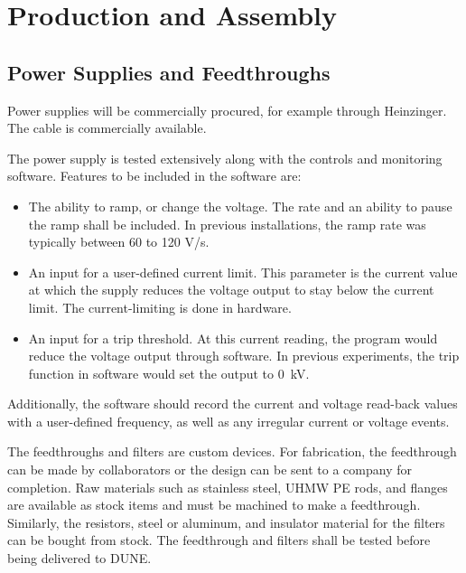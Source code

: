 \section{Production and Assembly }
\label{sec:fdsp-hv-prod-assy}

\subsection{Power Supplies and Feedthroughs}
\label{sec:fdsp-hv-supplies-feedthroughs}
Power supplies will be commercially procured, for example through Heinzinger. The  cable is commercially available.

The power supply is tested extensively along with the controls and monitoring software.  Features to be included in the software are:
\begin{itemize}
\item The ability to ramp, or change the voltage.  The rate and an ability to pause the ramp shall be included.  In previous installations, the ramp rate was typically between 60 to 120 V/s.
\item An input for a user-defined current limit.  This parameter is the current value at which the supply reduces the voltage output to stay below the current limit.  The current-limiting is done in hardware.
\item An input for a trip threshold.  At this current reading, the program would reduce the voltage output through software.  In previous experiments, the trip function in software would set the output to \SI{0}{kV}.
\end{itemize}
\noindent Additionally, the software should record the current and voltage read-back values with a user-defined frequency, as well as any irregular current or voltage events.

The  feedthroughs and filters are custom devices.  For fabrication, the feedthrough can be made by collaborators or the design can be sent to a company for completion.  Raw materials such as stainless steel, UHMW PE rods, and flanges are available as stock items and must be machined to make a feedthrough.  Similarly, the resistors, steel or aluminum, and insulator material for the filters can be bought from stock.  The feedthrough and filters shall be tested before being delivered to DUNE.

